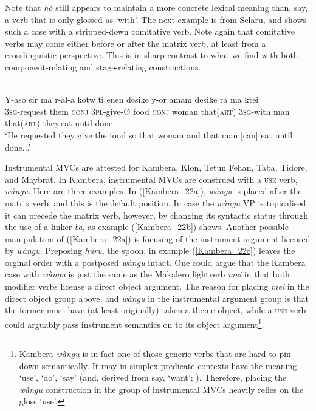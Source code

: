 Note that \textit{hó} still appears to maintain a more concrete lexical meaning than, say, a verb that is only glossed as `with'. The next example is from Selaru, and shows such a case with a stripped-down comitative verb. Note again that comitative verbs may come either before or after the matrix verb, at least from a crosslinguistic perspective. This is in sharp contrast to what we find with both component-relating and stage-relating constructions.

\ea 
{}\\
\gll Y-aso sir ma r-al-a kotw ti enen desike y-or amam desike ra ma ktei \\
3\textsc{sg}-request them \textsc{conj} 3\textsc{pl}-give-Ø food \textsc{conj} woman that(\textsc{art}) 3\textsc{sg}-with man that(\textsc{art}) they.eat until done \\
\glft `He requested they give the food so that woman and that man [can] eat until done...'\\ 
\z

Instrumental MVCs are attested for Kambera, Klon, Tetun Fehan, Taba, Tidore, and Maybrat. In Kambera, instrumental MVCs are construed with a \textsc{use} verb, \textit{wàngu}. Here are three examples. In (\ref{Kambera_22a}), \textit{wàngu} is placed after the matrix verb, and this is the default position. In case the \textit{wàngu} VP is topicalised, it can precede the matrix verb, however, by changing its syntactic status through the use of a linker \textit{ba}, as example (\ref{Kambera_22b}) shows. Another possible manipulation of (\ref{Kambera_22a}) is focusing of the instrument argument licensed by \textit{wàngu}. Preposing \textit{huru}, the spoon, in example (\ref{Kambera_22c}) leaves the orginal order with a postposed \textit{wàngu} intact. One could argue that the Kambera case with \textit{wàngu} is just the same as the Makalero lightverb \textit{mei} in that both modifier verbs license a direct object argument. The reason for placing \textit{mei} in the direct object group above, and \textit{wàngu} in the instrumental argument group is that the former must have (at least originally) taken a theme object, while a \textsc{use} verb could arguably pass instrument semantics on to its object argument\footnote{Kambera \textit{wàngu} is in fact one of those generic verbs that are hard to pin down semantically. It may in simplex predicate contexts have the meaning `use', `do', `say' (and, derived from say, `want'; \citealt[284ff.]{klamer1998grammar}). Therefore, placing the \textit{wàngu} construction in the group of instrumental MVCs heavily relies on the gloss `use'.}.

